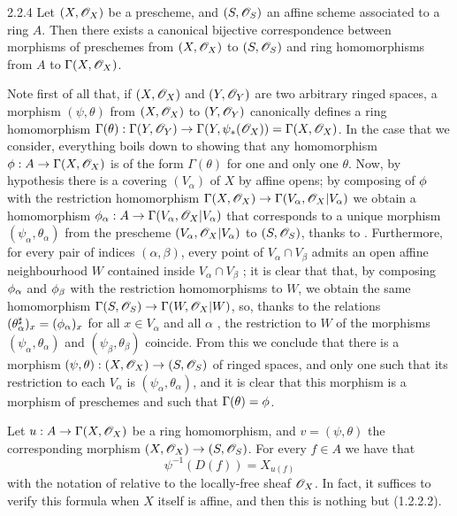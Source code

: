 \begin{envs}[Proposition]{2.2.4}
\label{prop-1.2.2.4}
Let $(X,\mathscr{O}_X)$ be a prescheme, and $(S,\mathscr{O}_S)$ an
affine scheme associated to a ring $A$. Then there exists a canonical bijective
correspondence between morphisms of preschemes from $(X,\mathscr{O}_X)$ to $(S,\mathscr{O}_S)$ and
ring homomorphisms from $A$ to $\Gamma(X,\mathscr{O}_X)$.
\end{envs}

Note first of all that, if $(X,\mathscr{O}_X)$ and $(Y,\mathscr{O}_Y)$ are two arbitrary ringed spaces,
a morphism $(\psi,\theta)$ from $(X,\mathscr{O}_X)$ to $(Y,\mathscr{O}_Y)$ canonically defines a ring
homomorphism
$\Gamma(\theta):\Gamma(Y,\mathscr{O}_Y)\to\Gamma(Y,\psi_*(\mathscr{O}_X))=\Gamma(X,\mathscr{O}_X)$.
In the case that we consider, everything boils down to showing that any
homomorphism $\phi:A\to\Gamma(X,\mathscr{O}_X)$ is of the form $\Gamma(\theta)$
for one and only one $\theta$. Now, by hypothesis there is a covering
$(V_\alpha)$ of $X$ by affine opens; by composing of $\phi$ with the
restriction homomorphism $\Gamma(X,\mathscr{O}_X)\to\Gamma(V_\alpha,\mathscr{O}_X|V_\alpha)$ we
obtain a homomorphism $\phi_\alpha:A\to\Gamma(V_\alpha,\mathscr{O}_X|V_\alpha)$
that corresponds to a unique morphism $(\psi_\alpha,\theta_\alpha)$ from the
prescheme $(V_\alpha,\mathscr{O}_X|V_\alpha)$ to $(S,\mathscr{O}_S)$, thanks to .
Furthermore, for every pair of indices $(\alpha,\beta)$, every point of
$V_\alpha\cap V_\beta$ admits an open affine neighbourhood $W$ contained inside
$V_\alpha\cap V_\beta$ ; it is clear that that, by composing
$\phi_\alpha$ and $\phi_\beta$ with the restriction homomorphisms to $W$,
we obtain the same homomorphism $\Gamma(S,\mathscr{O}_S)\to\Gamma(W,\mathscr{O}_X|W)$, so, thanks
to the relations $(\theta_\alpha^\sharp)_x=(\phi_\alpha)_x$ for all $x\in
V_\alpha$ and all $\alpha$ , the restriction to $W$ of the morphisms
$(\psi_\alpha,\theta_\alpha)$ and $(\psi_\beta,\theta_\beta)$ coincide. From
this we conclude that there is a morphism
$(\psi,\theta):(X,\mathscr{O}_X)\to(S,\mathscr{O}_S)$ of ringed spaces, and only one such
that its restriction to each $V_\alpha$ is $(\psi_\alpha,\theta_\alpha)$, and it
is clear that this morphism is a morphism of preschemes and such that
$\Gamma(\theta)=\phi$.

Let $u:A\to\Gamma(X,\mathscr{O}_X)$ be a ring homomorphism, and $v=(\psi,\theta)$
the corresponding morphism $(X,\mathscr{O}_X)\to(S,\mathscr{O}_S)$. For every $f\in A$ we have
that
\[
  \psi^{-1}(D(f))=X_{u(f)}
  \tag{2.2.4.1}
\]
with the notation of  relative to the locally-free sheaf
$\mathscr{O}_X$. In fact, it suffices to verify this formula when $X$ itself is affine,
and then this is nothing but (1.2.2.2).

